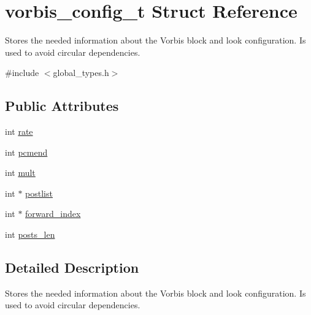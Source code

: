 \hypertarget{structvorbis__config__t}{
\section{vorbis\_\-config\_\-t Struct Reference}
\label{structvorbis__config__t}
}


Stores the needed information about the Vorbis block and look configuration. Is used to avoid circular dependencies.  


{\ttfamily \#include $<$global\_\-types.h$>$}\subsection*{Public Attributes}
\begin{DoxyCompactItemize}
\item 
int \hyperlink{structvorbis__config__t_ab83a7b52c88e2a6c12a827a303baab12}{rate}
\item 
int \hyperlink{structvorbis__config__t_accdf996ff263ae4c6ef374af4bc1b143}{pcmend}
\item 
int \hyperlink{structvorbis__config__t_a59c344a79d6907d529b1c7ae1acb3b0e}{mult}
\item 
int $\ast$ \hyperlink{structvorbis__config__t_ad32f3f7431dd4ae075eb4c872ba44b73}{postlist}
\item 
int $\ast$ \hyperlink{structvorbis__config__t_a46cff91e7bc0b1e5b6d1d02c834b3d9a}{forward\_\-index}
\item 
int \hyperlink{structvorbis__config__t_ad3f4331ef085115b3683f25680b32b19}{posts\_\-len}
\end{DoxyCompactItemize}


\subsection{Detailed Description}
Stores the needed information about the Vorbis block and look configuration. Is used to avoid circular dependencies. 

